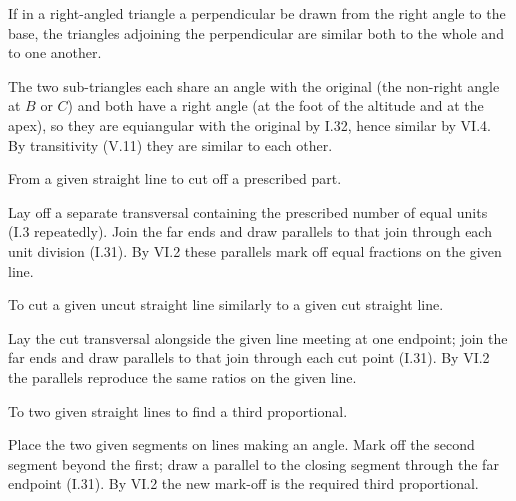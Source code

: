 \documentclass{rrxiv}
\begin{document}
\begin{claim}
\label{prop:VI.8}
If in a right-angled triangle a perpendicular be drawn from the right
angle to the base, the triangles adjoining the perpendicular are
similar both to the whole and to one another.
\end{claim}
\begin{evidence}[Proof of VI.8]
\label{ev:VI.8}
The two sub-triangles each share an angle with the original (the
non-right angle at $B$ or $C$) and both have a right angle (at the
foot of the altitude and at the apex), so they are equiangular with
the original by I.32, hence similar by VI.4.  By transitivity (V.11)
they are similar to each other.
\end{evidence}

\begin{claim}
\label{prop:VI.9}
From a given straight line to cut off a prescribed part.
\end{claim}
\begin{evidence}[Proof of VI.9]
\label{ev:VI.9}
Lay off a separate transversal containing the prescribed number of
equal units (I.3 repeatedly).  Join the far ends and draw parallels
to that join through each unit division (I.31).  By VI.2 these
parallels mark off equal fractions on the given line.
\end{evidence}

\begin{claim}
\label{prop:VI.10}
To cut a given uncut straight line similarly to a given cut straight
line.
\end{claim}
\begin{evidence}[Proof of VI.10]
\label{ev:VI.10}
Lay the cut transversal alongside the given line meeting at one
endpoint; join the far ends and draw parallels to that join through
each cut point (I.31).  By VI.2 the parallels reproduce the same
ratios on the given line.
\end{evidence}

\begin{claim}
\label{prop:VI.11}
To two given straight lines to find a third proportional.
\end{claim}
\begin{evidence}[Proof of VI.11]
\label{ev:VI.11}
Place the two given segments on lines making an angle.  Mark off the
second segment beyond the first; draw a parallel to the closing
segment through the far endpoint (I.31).  By VI.2 the new mark-off
is the required third proportional.
\end{evidence}
\end{document}
